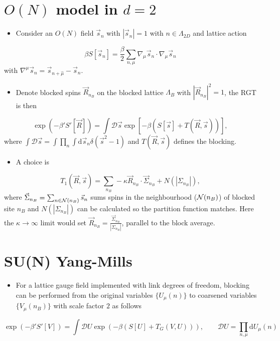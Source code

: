 \section{ $O(N)$ model in \(d=2\)}
\begin{itemize}
    \item Consider an $O(N)$ field $\vec{s}_n$ with $|\vec{s}_n| = 1$ with $n \in \Lambda_{2D}$ and lattice action
\end{itemize}
\begin{equation}
    \beta S[\vec{s}_n] = \frac{\beta}{2} \sum_{n, \mu} \nabla_\mu \vec{s}_n \cdot \nabla_\mu \vec{s}_n
\end{equation}
with $\nabla^\mu \vec{s}_n = \vec{s}_{n + \hat{\mu}} - \vec{s}_n$.
\begin{itemize}
    \item Denote blocked spins $\vec{R}_{n_B}$ on the blocked lattice $\Lambda_B$ with $|\vec{R}_{n_B}|^2 = 1$, the RGT is then
\end{itemize}
\begin{equation}
    \exp(-\beta' S'[\vec{R}]) = \int \mathcal{D}\vec{s}\exp[-\beta(S[\vec{s}] + T(\vec{R}, \vec{s}))],
\end{equation}
where $\int \mathcal{D}\vec{s} =\int \prod_n \int \text{d}\vec{s}_n \delta(\vec{s}^2 - 1)$ and $T(\vec{R}, \vec{s})$ defines the blocking.
\begin{itemize}
    \item A choice is
\end{itemize}
\begin{equation}
    T_1(\vec{R}, \vec{s}) = \sum_{n_B}-\kappa \vec{R}_{n_B}\cdot \vec{\Sigma}_{n_B} + N(|\Sigma_{n_B}|),
\end{equation}
where $\vec{\Sigma}_{n_B} = \sum_{n \in {\cal N}(n_B)}\vec{s}_n$ sums spins in the neighbourhood (${\cal N}({n}_B)$) of blocked site $n_B$  and $N(|\Sigma_{n_B}|)$ can be calculated so the partition function matches. Here the $\kappa \to \infty$ limit would set $\vec{R}_{n_B} = \frac{\vec{\Sigma}_{n_B}}{|\Sigma_{n_B}|}$, parallel to the block average.

\section{SU(N) Yang-Mills}
\begin{itemize}
    \item For a lattice gauge field implemented with link degrees of freedom, blocking can be performed from the original variables $\{ U_\mu(n)\}$ to coarsened variables $\{V_\mu(n_B)\}$ with scale factor $2$ as follows
\end{itemize}
\begin{equation}
    \exp(-\beta'S'[V]) = \int \mathcal{D}U \exp(-\beta(S[U] + T_G(V,U))), \qquad  \mathcal{D}U = \prod_{n,\mu}\text{d}U_\mu(n)
\end{equation}

